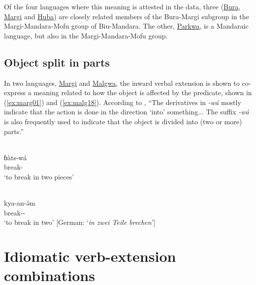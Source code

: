 Of the four languages where this meaning is attested in the data, three (\hyperref[bura]{Bura}, \hyperref[marg]{Margi} and \hyperref[huba]{Huba}) are closely related members of the Bura-Margi subgroup in the Margi-Mandara-Mofu group of Biu-Mandara. The other, \hyperref[park]{Parkwa}, is a Mandaraic language, but also in the Margi-Mandara-Mofu group.

\subsection{Object split in parts} \label{sec:objectsplit}

In two languages, \hyperref[marg]{Margi} and \hyperref[malg]{Malgwa}, the inward verbal extension is shown to co-express a meaning related to how the object is affected by the predicate, shown in (\ref{ex:marg01}) and (\ref{ex:malg18}). According to \citet[149]{hoffmannGrammarMargiLanguage1963}, ``The derivatives in \textit{-wá} mostly indicate that the action is done in the direction `into' something... The suffix \textit{-wá} is also frequently used to indicate that the object is divided into (two or more) parts.''

\ea\label{ex:marg01}
 \\
\gll ɓàts-wá	\\
break-	\\
\glt `to break in two pieces'

\ex\label{ex:malg18}
 \\
\gll kya-an-ə́m	\\
break--	\\
\glt `to break in two' [German: `\textit{in zwei Teile brechen}']
\z

\section{Idiomatic verb-extension combinations} \label{sec:colexical}

